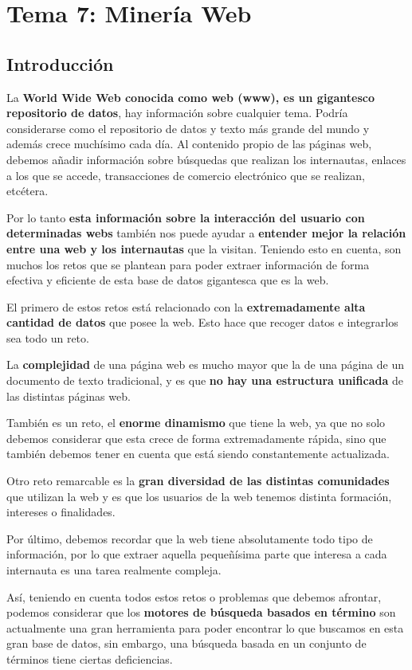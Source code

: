 \documentclass[12pt, twoside, openright]{report} %
\begin{document}
\chapter{Tema 7: Minería Web}
\section{Introducción}
La \textbf{World Wide Web conocida como web (www), es un gigantesco repositorio de datos}, hay información sobre cualquier tema. Podría considerarse como el repositorio de datos y texto más grande del mundo y además crece muchísimo cada día. Al contenido propio de las páginas web, debemos añadir información sobre búsquedas que realizan los internautas, enlaces a los que se accede, transacciones de comercio electrónico que se realizan, etcétera. 

Por lo tanto \textbf{esta información sobre la interacción del usuario con determinadas webs} también nos puede ayudar a \textbf{entender mejor la relación entre una web y los internautas} que la visitan. Teniendo esto en cuenta, son muchos los retos que se plantean para poder extraer información de forma efectiva y eficiente de esta base de datos gigantesca que es la web.

El primero de estos retos está relacionado con la \textbf{extremadamente alta cantidad de datos} que posee la web. Esto hace que recoger datos e integrarlos sea todo un reto. 

La \textbf{complejidad} de una página web es mucho mayor que la de una página de un documento de texto tradicional, y es que \textbf{no hay una estructura unificada} de las distintas páginas web.

También es un reto, el \textbf{enorme dinamismo} que tiene la web, ya que no solo debemos considerar que esta crece de forma extremadamente rápida, sino que también debemos tener en cuenta que está siendo constantemente actualizada. 

Otro reto remarcable es la \textbf{gran diversidad de las distintas comunidades} que utilizan la web y es que los usuarios de la web tenemos distinta formación, intereses o finalidades.

Por último, debemos recordar que la web tiene absolutamente todo tipo de información, por lo que extraer aquella pequeñísima parte que interesa a cada internauta es una tarea realmente compleja.

Así, teniendo en cuenta todos estos retos o problemas que debemos afrontar, podemos considerar que los \textbf{motores de búsqueda basados en término} son actualmente una gran herramienta para poder encontrar lo que buscamos en esta gran base de datos, sin embargo, una búsqueda basada en un conjunto de términos tiene ciertas deficiencias.
\end{document}
